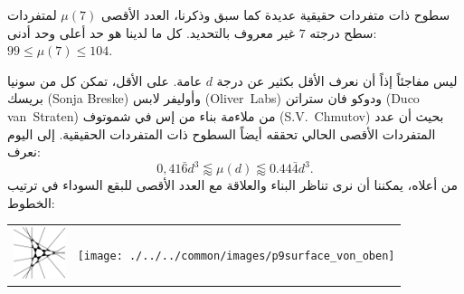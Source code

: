 \begin{surferPage}[216 Singularities]{سطوح ذات متفردات حقيقية عديدة}
كما سبق وذكرنا، العدد الأقصى $\mu(7)$ لمتفردات سطح درجته $7$ غير معروف بالتحديد. كل ما لدينا هو حد أعلى وحد أدنى: $99\le \mu(7) \le 104$.

   ليس مفاجئاً إذاً أن نعرف الأقل بكثير عن درجة  $d$ عامة.
    على الأقل، تمكن كل من سونيا بريسك
    \textenglish{(Sonja Breske)}
     وأوليفر لابس
      \textenglish{\mbox{(Oliver~Labs)}}
       ودوكو فان ستراتن
        \textenglish{(Duco van~Straten)}
         من ملاءمة بناء من إس في شموتوف
         \textenglish{(S.V.\ Chmutov)}
         بحيث أن عدد المتفردات الأقصى الحالي تحققه أيضاً السطوح ذات المتفردات الحقيقية.
    إلى اليوم نعرف:
    \[0,41\bar{6}d^3 \lessapprox \mu(d) \lessapprox 0.44\bar{4} d^3.\]
    من أعلاه، يمكننا أن نرى تناظر البناء والعلاقة مع العدد الأقصى للبقع السوداء في ترتيب الخطوط:
    \begin{center}
      \begin{tabular}{c@{\qquad}c}
        \includegraphics[height=1.5cm]{./../../common/images/vielesing.pdf}
        &
        \texttt{[image: ./../../common/images/p9surface\_von\_oben]}
      \end{tabular}
    \end{center}
\end{surferPage}
